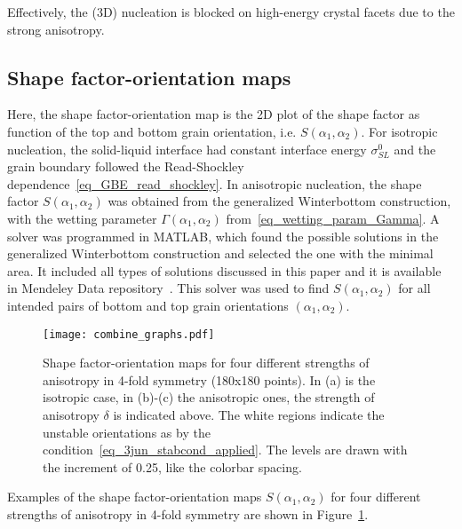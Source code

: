 	Effectively, the (3D) nucleation is blocked on high-energy crystal facets due to the strong anisotropy. 
	
	\subsection{Shape factor-orientation maps}
	Here, the shape factor-orientation map is the 2D plot of the shape factor as function of the top and bottom grain orientation, i.e. $S(\alpha_1,\alpha_2)$. For isotropic nucleation, the solid-liquid interface had constant interface energy $\sigma_{SL}^0$ and the grain boundary followed the Read-Shockley dependence~\eqref{eq_GBE_read_shockley}. In anisotropic nucleation, the shape factor $S(\alpha_1,\alpha_2)$ was obtained from the generalized Winterbottom construction, with the wetting parameter $\Gamma(\alpha_1,\alpha_2)$ from~\eqref{eq_wetting_param_Gamma}. A solver was programmed in MATLAB, which found the possible solutions in the generalized Winterbottom construction and selected the one with the minimal area. It included all types of solutions discussed in this paper and it is available in Mendeley Data repository~\cite{Minar2023dataset}. This solver was used to find $S(\alpha_1,\alpha_2)$ for all intended pairs of bottom and top grain orientations $(\alpha_1,\alpha_2)$.
	
	\begin{figure}
		\centering        
		\texttt{[image: combine\_graphs.pdf]}
		\caption[Shape factor-orientation maps for four different strengths of anisotropy in 4-fold symmetry (180x180 points)]{Shape factor-orientation maps for four different strengths of anisotropy in 4-fold symmetry (180x180 points). In (a) is the isotropic case, in (b)-(c) the anisotropic ones, the strength of anisotropy $\delta$ is indicated above. The white regions indicate the unstable orientations as by the condition~\eqref{eq_3jun_stabcond_applied}. The levels are drawn with the increment of 0.25, like the colorbar spacing.}
		\label{fig_SFori_maps}
	\end{figure}
	
	Examples of the shape factor-orientation maps $S(\alpha_1,\alpha_2)$ for four different strengths of anisotropy in 4-fold symmetry are shown in Figure~\ref{fig_SFori_maps}.
	
